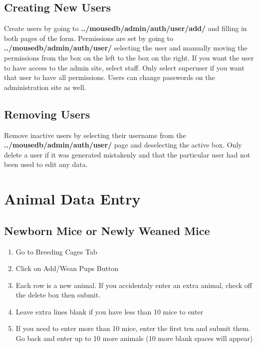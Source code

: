 \documentclass[letterpaper,10pt,english]{sphinxmanual}
\begin{document}
\section{Creating New Users}
\label{usage:creating-new-users}
Create users by going to \textbf{../mousedb/admin/auth/user/add/} and filling in both pages of the form.  Permissions are set by going to \textbf{../mousedb/admin/auth/user/} selecting the user and manually moving the permissions from the box on the left to the box on the right.  If you want the user to have access to the admin site, select staff.  Only select superuser if you want that user to have all permissions.  Users can change passwords on the administration site as well.


\section{Removing Users}
\label{usage:removing-users}
Remove inactive users by selecting their username from the \textbf{../mousedb/admin/auth/user/} page and deselecting the active box.  Only delete a user if it was generated mistakenly and that the particular user had not been used to edit any data.


\chapter{Animal Data Entry}
\label{usage:animal-data-entry}

\section{Newborn Mice or Newly Weaned Mice}
\label{usage:newborn-mice-or-newly-weaned-mice}\begin{enumerate}
\item {} 
Go to Breeding Cages Tab

\item {} 
Click on Add/Wean Pups Button

\item {} 
Each row is a new animal.  If you accidentaly enter an extra animal, check off the delete box then submit.

\item {} 
Leave extra lines blank if you have less than 10 mice to enter

\item {} 
If you need to enter more than 10 mice, enter the first ten and submit them.  Go back and enter up to 10 more animals (10 more blank spaces will appear)

\end{enumerate}
\end{document}
